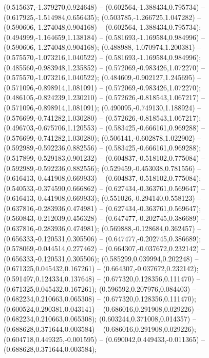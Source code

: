  (0.515637,-1.379270,0.924648) -- (0.602564,-1.388434,0.795734) -- (0.617925,-1.514984,0.656435);
 (0.503785,-1.266725,1.047282) -- (0.590606,-1.274048,0.904168) -- (0.602564,-1.388434,0.795734);
 (0.494999,-1.164659,1.138184) -- (0.581693,-1.169584,0.984996) -- (0.590606,-1.274048,0.904168);
 (0.488988,-1.070974,1.200381) -- (0.575570,-1.073216,1.040522) -- (0.581693,-1.169584,0.984996);
 (0.485560,-0.983948,1.235852) -- (0.572069,-0.983426,1.072270) -- (0.575570,-1.073216,1.040522);
 (0.484609,-0.902127,1.245695) -- (0.571096,-0.898914,1.081091) -- (0.572069,-0.983426,1.072270);
 (0.486105,-0.824239,1.230210) -- (0.572626,-0.818543,1.067217) -- (0.571096,-0.898914,1.081091);
 (0.490095,-0.749130,1.188924) -- (0.576699,-0.741282,1.030280) -- (0.572626,-0.818543,1.067217);
 (0.496703,-0.675706,1.120553) -- (0.583425,-0.666161,0.969288) -- (0.576699,-0.741282,1.030280);
 (0.506141,-0.602878,1.022902) -- (0.592989,-0.592236,0.882556) -- (0.583425,-0.666161,0.969288);
 (0.517899,-0.529183,0.901232) -- (0.604837,-0.518102,0.775084) -- (0.592989,-0.592236,0.882556);
 (0.529459,-0.453038,0.781556) -- (0.616413,-0.441908,0.669933) -- (0.604837,-0.518102,0.775084);
 (0.540533,-0.374590,0.666862) -- (0.627434,-0.363761,0.569647) -- (0.616413,-0.441908,0.669933);
 (0.551026,-0.294140,0.558123) -- (0.637816,-0.283936,0.474981) -- (0.627434,-0.363761,0.569647);
 (0.560843,-0.212039,0.456328) -- (0.647477,-0.202745,0.386689) -- (0.637816,-0.283936,0.474981);
 (0.569888,-0.128684,0.362457) -- (0.656333,-0.120531,0.305506) -- (0.647477,-0.202745,0.386689);
 (0.578069,-0.044514,0.277462) -- (0.664307,-0.037672,0.232142) -- (0.656333,-0.120531,0.305506);
 (0.585299,0.039994,0.202248) -- (0.671325,0.045432,0.167261) -- (0.664307,-0.037672,0.232142);
 (0.591497,0.124334,0.137648) -- (0.677320,0.128356,0.111470) -- (0.671325,0.045432,0.167261);
 (0.596592,0.207976,0.084403) -- (0.682234,0.210663,0.065308) -- (0.677320,0.128356,0.111470);
 (0.600524,0.290381,0.043141) -- (0.686016,0.291908,0.029226) -- (0.682234,0.210663,0.065308);
 (0.603244,0.371008,0.014357) -- (0.688628,0.371644,0.003584) -- (0.686016,0.291908,0.029226);
 (0.604718,0.449325,-0.001595) -- (0.690042,0.449433,-0.011365) -- (0.688628,0.371644,0.003584);
